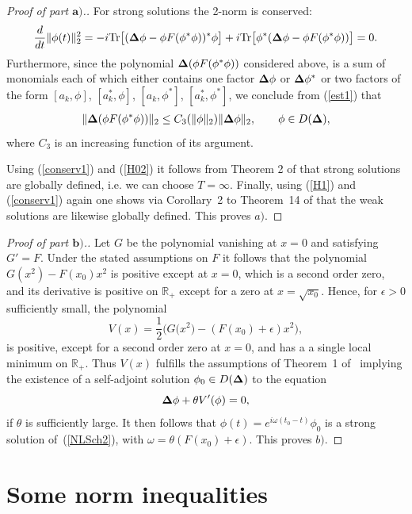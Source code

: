 \documentclass[pdftex]{sigma}
\begin{document}
\begin{proof}[Proof of part $\boldsymbol{a)}$.]
For strong solutions the 2-norm is conserved:
\begin{gather}\label{conserv1}
\frac{d}{dt}\Vert\phi(t)\Vert^2_2
= -i{\rm Tr}\big[({\bf\Delta}\phi -\phi F(\phi^*\phi))^*\phi\big] +
i{\rm Tr}\big[\phi^*({\bf\Delta}\phi-\phi F(\phi^*\phi))\big] =0 .
\end{gather}
Furthermore, since the polynomial ${\bf\Delta}(\phi F(\phi^*\phi))$ considered
above,  is a sum of monomials each of which either contains one factor
${\bf\Delta}\phi$ or ${\bf\Delta}\phi^*$ or two factors of the form
$[a_k,\phi]$, $[a^*_k,\phi]$, $[a_k,\phi^*]$,  $[a^*_k,\phi^*]$, we
conclude from (\ref{est1}) that
\begin{gather}\label{H02}
\Vert{\bf\Delta}( \phi F(\phi^*\phi))\Vert _2\leq C_3(\Vert\phi\Vert_2)
\Vert{\bf\Delta}\phi\Vert_2 ,\qquad \phi\in D({\bf\Delta}) ,
\end{gather}
where $C_3$ is an increasing function of its argument.

Using (\ref{conserv1}) and (\ref{H02}) it follows from Theorem 2 of
\cite{Reed} that strong solutions are globally def\/ined, i.e. we can
choose $T=\infty$. Finally, using (\ref{H1}) and (\ref{conserv1}) again
one shows via Corollary~2 to Theorem~14 of \cite{Reed} that the weak
solutions are likewise globally def\/ined. This proves $a)$.
\end{proof}

\begin{proof}[Proof of part $\boldsymbol{b)}$.] Let $G$ be the polynomial vanishing
at $x=0$ and satisfying $G'=F$. Under the stated assumptions on $F$
it follows that the polynomial $G(x^2)-F(x_0)x^2$ is positive  except
at $x=0$, which is a second order zero, and its derivative is positive
on $\mathbb R_+$ except for a zero at $x=\sqrt{x_0}$. Hence, for
$\epsilon >0$ suf\/f\/iciently small, the polynomial
\[
V(x) = \frac 12\big(G\big(x^2\big)- (F(x_0)+\epsilon)x^2\big) ,
\]
is positive, except for a second order zero at $x=0$, and has a
a single local minimum on $\mathbb R_+$. Thus $V(x)$ fulf\/ills the
assumptions of Theorem~1 of~\cite{DJN} implying the existence of a
self-adjoint solution $\phi_0\in D({\bf\Delta})$ to the equation
\[
{\bf\Delta}\phi + \theta V'(\phi) = 0 ,
\]
if $\theta$ is suf\/f\/iciently large.  It then follows that $\phi(t) =
e^{i\omega(t_0-t)}\phi_0$ is a strong solution of~(\ref{NLSch2}), with
$\omega=\theta(F(x_0)+\epsilon)$.
This proves $b)$.
\end{proof}


\section{Some norm inequalities}
\label{secframe}
\end{document}
